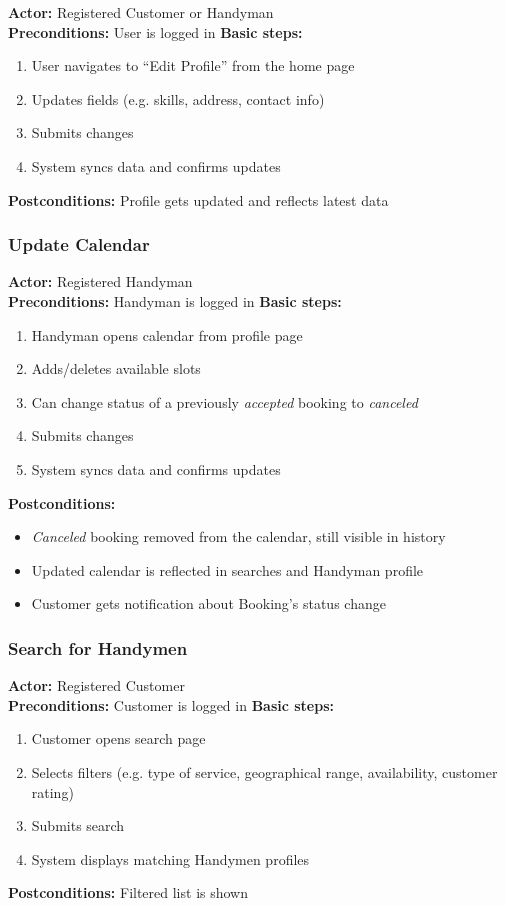 \documentclass[11pt,a4paper]{article}
\begin{document}
\textbf{Actor:} Registered Customer or Handyman\\
\textbf{Preconditions:} User is logged in
\textbf{Basic steps:}
\begin{enumerate}
\item User navigates to ``Edit Profile'' from the home page
\item Updates fields (e.g. skills, address, contact info)
\item Submits changes
\item System syncs data and confirms updates
\end{enumerate}
\textbf{Postconditions:} Profile gets updated and reflects latest data

\subsubsection{Update Calendar}

\textbf{Actor:} Registered Handyman\\
\textbf{Preconditions:} Handyman is logged in
\textbf{Basic steps:}
\begin{enumerate}
\item Handyman opens calendar from profile page
\item Adds/deletes available slots
\item Can change status of a previously \textit{accepted} booking to \textit{canceled}
\item Submits changes
\item System syncs data and confirms updates
\end{enumerate}
\textbf{Postconditions:}
\begin{itemize}
\item \textit{Canceled} booking removed from the calendar, still visible in history
\item Updated calendar is reflected in searches and Handyman profile
\item Customer gets notification about Booking's status change 
\end{itemize}

\subsubsection{Search for Handymen}

\textbf{Actor:} Registered Customer \\
\textbf{Preconditions:} Customer is logged in
\textbf{Basic steps:}
\begin{enumerate}
\item Customer opens search page
\item Selects filters (e.g. type of service, geographical range, availability, customer rating)
\item Submits search
\item System displays matching Handymen profiles
\end{enumerate}
\textbf{Postconditions:} Filtered list is shown
\end{document}
